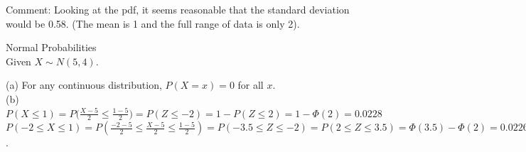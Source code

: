 \documentclass[bigtut]{tutorial}\usepackage[]{graphicx}\usepackage[]{color}
\makeatletter
\newcommand{\hlnum}[1]{\textcolor[rgb]{0.686,0.059,0.569}{#1}}%
\newcommand{\hlcom}[1]{\textcolor[rgb]{0.678,0.584,0.686}{\textit{#1}}}%
\newcommand{\hlstd}[1]{\textcolor[rgb]{0.345,0.345,0.345}{#1}}%
\newcommand{\hlkwd}[1]{\textcolor[rgb]{0.737,0.353,0.396}{\textbf{#1}}}%
\newenvironment{kframe}{%
 \def\at@end@of@kframe{}%
 \ifinner\ifhmode%
  \def\at@end@of@kframe{\end{minipage}}%
  \begin{minipage}{\columnwidth}%
 \fi\fi%
 \def\FrameCommand##1{\hskip\@totalleftmargin \hskip-\fboxsep
 \colorbox{shadecolor}{##1}\hskip-\fboxsep
     \hskip-\linewidth \hskip-\@totalleftmargin \hskip\columnwidth}%
 \MakeFramed {\advance\hsize-\width
   \@totalleftmargin\z@ \linewidth\hsize
   \@setminipage}}%
 {\par\unskip\endMakeFramed%
 \at@end@of@kframe}
\newenvironment{knitrout}{}{} %
\makeatother
\begin{document}
\begin{tutorial}
\begin{questions}
\begin{solution}
Comment: Looking at the pdf, it seems reasonable that the standard deviation would be 0.58.
(The mean is 1 and the full range of data is only 2).

\end{solution}


\question Normal Probabilities  \\

Given $X \sim N (5,4)$. \\


\begin{solution}
(a)
For any continuous distribution, $P(X=x) = 0$  for all $x$. \\

(b) 
$P(X \leq 1) = P \big( \frac{X-5}{2} \leq \frac{1-5}{2} \big) = P(Z \leq -2) = 1- P(Z \leq 2) = 1- \Phi(2) = 0.0228$  \\ 
$P(-2 \leq X \leq 1) = P(\frac{-2-5}{2} \leq \frac{X-5}{2} \leq \frac{1-5}{2}) = P(-3.5 \leq Z \leq -2) =
P(2 \leq Z \leq 3.5) = \Phi(3.5)-\Phi(2) = 0.0226$.


\end{solution}
\end{questions}
\end{tutorial}
\end{document}
